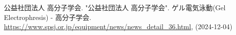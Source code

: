 \documentclass[uplatex,dvipdfmx,a4paper,10pt]{jsarticle}
\begin{document}
    \begin{thebibliography}{99}
         公益社団法人 高分子学会. "公益社団法人 高分子学会". ゲル電気泳動(Gel Electrophresis) - 高分子学会. \url{https://www.spsj.or.jp/equipment/news/news_detail_36.html}, (2024-12-04)
    \end{thebibliography}
    
    
    \appendix
    \setcounter{figure}{0}
    \setcounter{table}{0}
    \renewcommand{\thetable}{\Alph{section}\arabic{table}}
    \renewcommand{\thefigure}{\Alph{section}\arabic{figure}}
    \makeatletter 
    \newcommand{\section@cntformat}{付録 \thesection:\ }
    \makeatother
    
    
\end{document}
